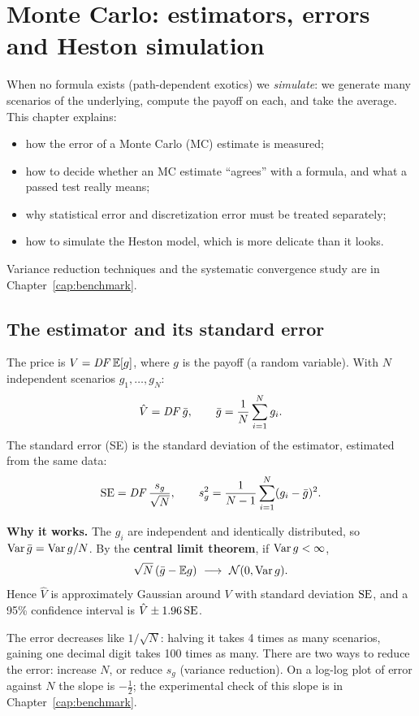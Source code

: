\chapter{Monte Carlo: estimators, errors and Heston simulation}
\label{cap:mc}

When no formula exists (path-dependent exotics) we \emph{simulate}: we generate many scenarios of the underlying,
compute the payoff on each, and take the average. This chapter explains:
\begin{itemize}
\item how the error of a Monte Carlo (MC) estimate is measured;
\item how to decide whether an MC estimate ``agrees'' with a formula, and what a passed test really means;
\item why statistical error and discretization error must be treated separately;
\item how to simulate the Heston model, which is more delicate than it looks.
\end{itemize}
Variance reduction techniques and the systematic convergence study are in Chapter~\ref{cap:benchmark}.

\section{The estimator and its standard error}
The price is $V=\mathit{DF}\,\mathbb{E}[g]$, where $g$ is the payoff (a random variable). With $N$ independent scenarios
$g_1,\dots,g_N$:
\begin{equation}\label{eq:mc-stima}
\hat V=\mathit{DF}\,\bar g,\qquad\bar g=\frac1N\sum_{i=1}^Ng_i .
\end{equation}
The standard error (SE) is the standard deviation of the estimator, estimated from the same data:
\begin{equation}\label{eq:mc-se}
\mathrm{SE}=\mathit{DF}\,\frac{s_g}{\sqrt N},\qquad s_g^2=\frac1{N-1}\sum_{i=1}^N(g_i-\bar g)^2 .
\end{equation}

\textbf{Why it works.} The $g_i$ are independent and identically distributed, so $\operatorname{Var}\bar g=\operatorname{Var} g/N$. By the
\textbf{central limit theorem}, if $\operatorname{Var} g<\infty$,
\[
\sqrt N\,(\bar g-\mathbb{E} g)\ \longrightarrow\ \mathcal{N}(0,\operatorname{Var} g).
\]
Hence $\hat V$ is approximately Gaussian around $V$ with standard deviation $\mathrm{SE}$, and a 95\% confidence interval is
$\hat V\pm1.96\,\mathrm{SE}$.

\begin{idea}[title={\texorpdfstring{Key idea: the $N^{-1/2}$ law}{Key idea: the N\textasciicircum(-1/2) law}}]
The error decreases like $1/\sqrt N$: halving it takes 4 times as many scenarios, gaining one decimal digit takes 100
times as many. There are two ways to reduce the error: increase $N$, or reduce $s_g$ (variance reduction). On a
log-log plot of error against $N$ the slope is $-\tfrac12$; the experimental check of this slope is in
Chapter~\ref{cap:benchmark}.
\end{idea}

